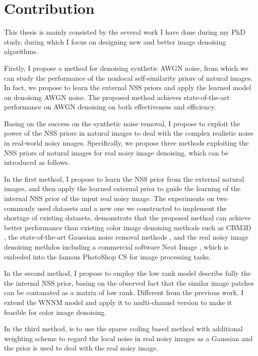 \section{Contribution}
\label{sec:intro:new}

This thesis is mainly consisted by the several work I have done during my PhD study, during which I focus on designing new and better image denoising algorithms. 

Firstly, I propose a method for denoising synthetic AWGN noise, from which we can study the performance of the nonlocal self-similarity priors of natural images. In fact, we propose to learn the external NSS priors and apply the learned model on denoising AWGN noise. The proposed method achieves state-of-the-art performance on AWGN denoising on both effectiveness and efficiency. 

Basing on the success on the synthetic noise removal, I propose to exploit the power of the NSS priors in natural images to deal with the complex realistic noise in real-world noisy images. Specifically, we propose three methods exploiting the NSS priors of natural images for real noisy image denoising, which can be introduced as follows.

In the first method, I propose to learn the NSS prior from the external natural images, and then apply the learned external prior to guide the learning of the internal NSS prior of the input real noisy image. The experiments on two commonly used datasets and a new one we constructed to implement the shortage of existing datasets, demonstrate that the proposed method can achieve better performance than existing color image denoising methods such as CBM3D \cite{cbm3d}, the state-of-the-art Gaussian noise removal methods \cite{bm3d,mlp,csr}, and the real noisy image denoising methdos \cite{} including a commercial software Neat Image \cite{neatimage}, which is embeded into the famous PhotoShop CS for image processing tasks.


In the second method, I propose to employ the low rank model describe fully the the internal NSS prior, basing on the observed fact that the similar image patches can be contanated as a matrix of low rank. Different from the previous work, I extend the WNNM model and apply it to multi-channel version to make it feasible for color image denoising. 


In the third method,  is to use the sparse coding based method with additional weighting scheme to regard the local noise in real noisy images as a Gaussian and the prior is used to deal with the real noisy image.


